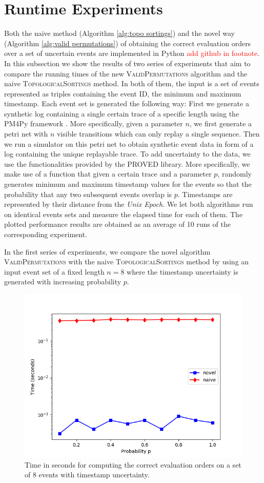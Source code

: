 \section{Runtime Experiments}
Both the naive method (Algorithm \ref{alg:topo sortings}) and the novel way (Algorithm \ref{alg:valid permutations}) of obtaining the correct evaluation orders over a set of uncertain events are implemented in Python \textcolor{red}{add github in footnote}.
In this subsection we show the results of two series of experiments that aim to compare the running times of the new \textsc{ValidPermutations} algorithm and the naive \textsc{TopologicalSortings} method.
In both of them, the input is a set of events represented as triples containing the event ID, the minimum and maximum timestamp.
Each event set is generated the following way: First we generate a synthetic log containing a single certain trace of a specific length using the PM4Py framework \cite{pm4py}.
More specifically, given a parameter $n$, we first generate a petri net with $n$ visible transitions which can only replay a single sequence.
Then we run a simulator on this petri net to obtain synthetic event data in form of a log containing the unique replayable trace.
To add uncertainty to the data, we use the functionalities provided by the PROVED \cite{proved} library.
More specifically, we make use of a function that given a certain trace and a parameter $p$, randomly generates minimum and maximum timestamp values for the events so that the probability that any two subsequent events overlap is $p$.
Timestamps are represented by their distance from the \textit{Unix Epoch}.
We let both algorithms run on identical events sets and measure the elapsed time for each of them.
The plotted performance results are obtained as an average of 10 runs of the corresponding experiment.

In the first series of experiments, we compare the novel algorithm \textsc{ValidPermutations} with the naive \textsc{TopologicalSortings} method by using an input event set of a fixed length $n=8$ where the timestamp uncertainty is generated with increasing probability $p$.
%
%
%
\begin{figure}
	\centering
	\includegraphics[width=0.8\columnwidth]{figures/n_fixed_8_logscale.png}
	\caption{Time in seconds for computing the correct evaluation orders on a set of 8 events with timestamp uncertainty.}
	\label{fig: series1}
\end{figure}
%
%
%

